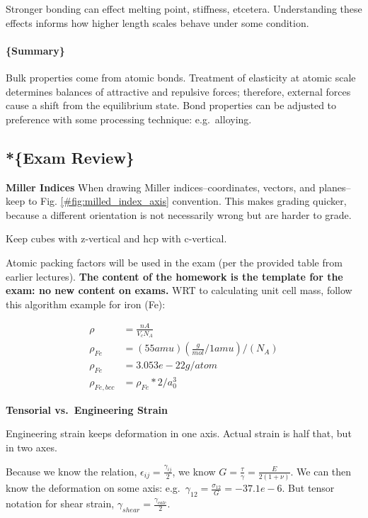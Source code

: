 \documentclass[
]{article}
\begin{document}
{Stronger bonding can effect melting point, stiffness, etcetera.
Understanding these effects informs how higher length scales behave
under some condition.}

\hypertarget{summary-2}{%
\paragraph{\{Summary\}}\label{summary-2}}

Bulk properties come from atomic bonds. Treatment of elasticity at
atomic scale determines balances of attractive and repulsive forces;
therefore, external forces cause a shift from the equilibrium state.
Bond properties can be adjusted to preference with some processing
technique: e.g.~alloying.

\hypertarget{exam-review}{%
\subsection{*\{Exam Review\}}\label{exam-review}}

\textbf{Miller Indices} When drawing Miller indices--coordinates,
vectors, and planes--keep to Fig. \ref{#fig:milled_index_axis}
convention. This makes grading quicker, because a different orientation
is not necessarily wrong but are harder to grade.

{Keep cubes with z-vertical and hcp with c-vertical.}

Atomic packing factors will be used in the exam (per the provided table
from earlier lectures).
\textbf{The content of the homework is the template for the exam: no new content on exams.}
WRT to calculating unit cell mass, follow this algorithm example for
iron (Fe):

\begin{align}
\rho &= \frac{nA}{V_{c}N_{A}} \\
\rho_{Fe} &= (55 amu) (\frac{g}{mol}/1 amu) / (N_{A}) \\
\rho_{Fe} &= 3.053e-22 g/atom \\
\rho_{Fe, bcc} &= \rho_{Fe}*2/a_{0}^{3}
\end{align}

\textbf{Tensorial vs.~Engineering Strain}

{Engineering strain keeps deformation in one axis. Actual strain is half
that, but in two axes.}

Because we know the relation, \(\epsilon_{ij} = \frac{\gamma_{ij}}{2}\),
we know \(G = \frac{\tau}{\gamma} = \frac{E}{2(1 + \nu)}\). We can then
know the deformation on some axis:
e.g.~\(\gamma_{12} = \frac{\sigma_{12}}{G} = -37.1e-6\). But tensor
notation for shear strain, \(\gamma_{shear} = \frac{\gamma_{calc}}{2}\).
\end{document}
